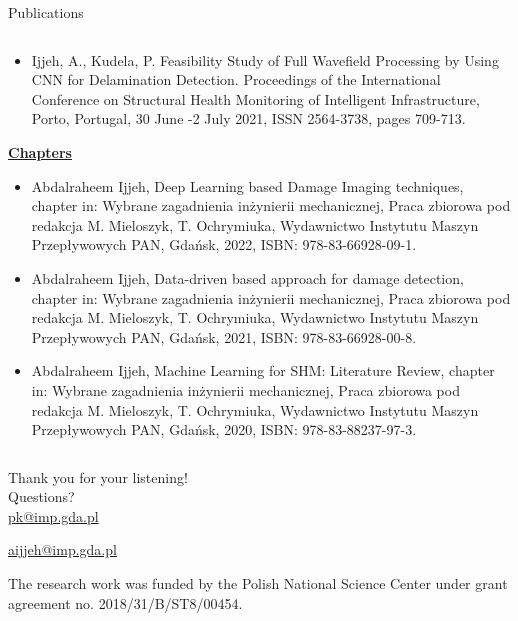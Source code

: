 \documentclass[10pt,aspectratio=169,dvipsnames]{beamer} %
\begin{document}
\begin{frame}{Publications}
\begin{tiny}
\begin{columns}[T]
\begin{column}[t]{0.48\textwidth}
\begin{itemize}
						\item {Ijjeh, A.}, Kudela, P. Feasibility Study of Full Wavefield Processing by Using CNN for Delamination
						Detection. 
						Proceedings of the International Conference on Structural Health Monitoring of Intelligent
						Infrastructure, Porto, Portugal, 30 June -2 July 2021, ISSN 2564-3738, pages 709-713.
					\end{itemize}		
					\underline{\textbf{Chapters}}					
					\begin{itemize}
						\justifying
						\item {Abdalraheem Ijjeh}, Deep Learning based Damage Imaging techniques, chapter in: Wybrane zagadnienia
						inżynierii mechanicznej, Praca zbiorowa pod redakcja M. Mieloszyk, T. Ochrymiuka, Wydawnictwo Instytutu
						Maszyn Przepływowych PAN, Gdańsk, 2022, ISBN: 978-83-66928-09-1.
						\item {Abdalraheem Ijjeh}, Data-driven based approach for damage detection, chapter in: Wybrane zagadnienia
						inżynierii mechanicznej, Praca zbiorowa pod redakcja M. Mieloszyk, T. Ochrymiuka, Wydawnictwo Instytutu
						Maszyn Przepływowych PAN, Gdańsk, 2021, ISBN: 978-83-66928-00-8.				
						\item {Abdalraheem Ijjeh}, Machine Learning for SHM: Literature Review, chapter in: Wybrane zagadnienia
						inżynierii mechanicznej, Praca zbiorowa pod redakcja M. Mieloszyk, T. Ochrymiuka, Wydawnictwo Instytutu
						Maszyn Przepływowych PAN, Gdańsk, 2020, ISBN: 978-83-88237-97-3.
					\end{itemize}
				\end{column}		
			\end{columns}
		\end{tiny}
	\end{frame}	
	
	{
		\begin{frame}[standout]
			Thank you for your listening!\\ \vspace{12pt}
			Questions?\\ \vspace{12pt}
						\url{pk@imp.gda.pl} 
						\par\medskip
			\url{aijjeh@imp.gda.pl}
			\par\medskip
			\par\medskip
			\footnotesize
			The research work was funded by the Polish National Science Center under grant agreement no. 2018/31/B/ST8/00454.
		\end{frame}
	}
\end{document}
